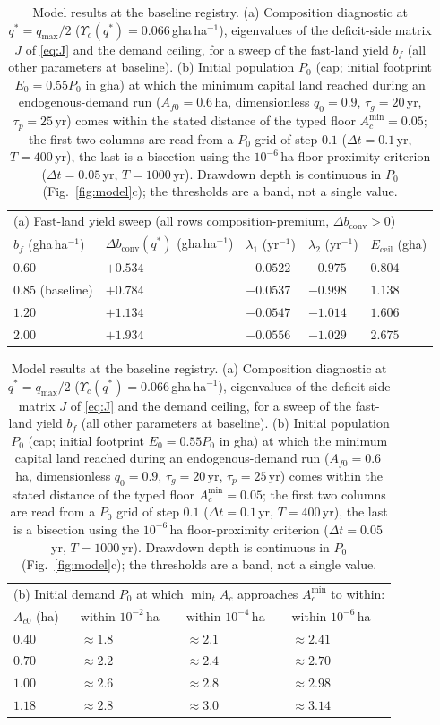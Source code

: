 \documentclass[preprint,12pt,authoryear]{elsarticle}
\newcommand{\dconv}{\Delta b_{\mathrm{conv}}}
\newcommand{\Ups}{\Upsilon_c}
\newcommand{\Eceil}{E_{\mathrm{ceil}}}
\newcommand{\Acmin}{A_c^{\min}}
\begin{document}
\begin{table}[!htbp]
\centering\small
\caption{Model results at the baseline registry. (a) Composition diagnostic at $q^*=q_{\max}/2$ ($\Ups(q^*)=0.066$\,gha\,ha$^{-1}$), eigenvalues of the deficit-side matrix $J$ of \eqref{eq:J} and the demand ceiling, for a sweep of the fast-land yield $b_f$ (all other parameters at baseline). (b) Initial population $P_0$ (cap; initial footprint $E_0=0.55P_0$ in gha) at which the minimum capital land reached during an endogenous-demand run ($A_{f0}=0.6$\,ha, dimensionless $q_0=0.9$, $\tau_g=20$\,yr, $\tau_p=25$\,yr) comes within the stated distance of the typed floor $\Acmin=0.05$; the first two columns are read from a $P_0$ grid of step $0.1$ ($\Delta t=0.1$\,yr, $T=400$\,yr), the last is a bisection using the $10^{-6}$\,ha floor-proximity criterion ($\Delta t=0.05$\,yr, $T=1000$\,yr). Drawdown depth is continuous in $P_0$ (Fig.~\ref{fig:model}c); the thresholds are a band, not a single value.}
\label{tab:model}
\begin{tabular}{l l l l l}
\toprule
\multicolumn{5}{l}{(a) Fast-land yield sweep (all rows composition-premium, $\dconv>0$)}\\
$b_f$ (gha\,ha$^{-1}$) & $\dconv(q^*)$ (gha\,ha$^{-1}$) & $\lambda_1$ (yr$^{-1}$) & $\lambda_2$ (yr$^{-1}$) & $\Eceil$ (gha) \\
\midrule
$0.60$ & $+0.534$ & $-0.0522$ & $-0.975$ & $0.804$ \\
$0.85$ (baseline) & $+0.784$ & $-0.0537$ & $-0.998$ & $1.138$ \\
$1.20$ & $+1.134$ & $-0.0547$ & $-1.014$ & $1.606$ \\
$2.00$ & $+1.934$ & $-0.0556$ & $-1.029$ & $2.675$ \\
\bottomrule
\end{tabular}

\medskip
\begin{tabular}{l l l l}
\toprule
\multicolumn{4}{l}{(b) Initial demand $P_0$ at which $\min_tA_c$ approaches $\Acmin$ to within:}\\
$A_{c0}$ (ha) & within $10^{-2}$\,ha & within $10^{-4}$\,ha & within $10^{-6}$\,ha \\
\midrule
$0.40$ & $\approx1.8$ & $\approx2.1$ & $\approx2.41$ \\
$0.70$ & $\approx2.2$ & $\approx2.4$ & $\approx2.70$ \\
$1.00$ & $\approx2.6$ & $\approx2.8$ & $\approx2.98$ \\
$1.18$ & $\approx2.8$ & $\approx3.0$ & $\approx3.14$ \\
\bottomrule
\end{tabular}
\end{table}
\end{document}
